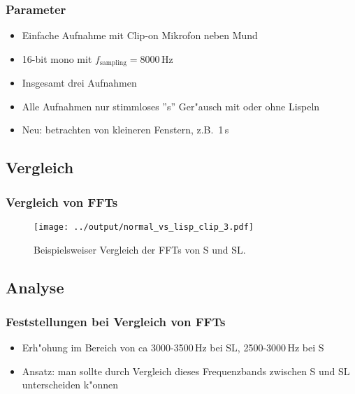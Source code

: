 \documentclass[11pt]{beamer}
\begin{document}
\begin{frame}
\frametitle{Parameter}
\begin{itemize}
\item Einfache Aufnahme mit Clip-on Mikrofon neben Mund
\item 16-bit mono mit $f_\mathrm{sampling}=8000$\,Hz
\item Insgesamt drei Aufnahmen
\item Alle Aufnahmen nur stimmloses ''s'' Ger"ausch mit oder ohne Lispeln\
\item Neu: betrachten von kleineren Fenstern, z.B.\ 1\,s
\end{itemize}
\end{frame}

\subsection{Vergleich}

\begin{frame}
\frametitle{Vergleich von FFTs}
\begin{figure}
\texttt{[image: ../output/normal\_vs\_lisp\_clip\_3.pdf]}
\caption{Beispielsweiser Vergleich der FFTs von S und SL.}
\end{figure}
\end{frame}

\subsection{Analyse}

\begin{frame}
\frametitle{Feststellungen bei Vergleich von FFTs}
\begin{itemize}
\item Erh"ohung im Bereich von ca 3000-3500\,Hz bei SL, 2500-3000\,Hz bei S 
\item Ansatz: man sollte durch Vergleich dieses Frequenzbands zwischen S und SL unterscheiden k"onnen
\end{itemize}
\end{frame}
\end{document}

